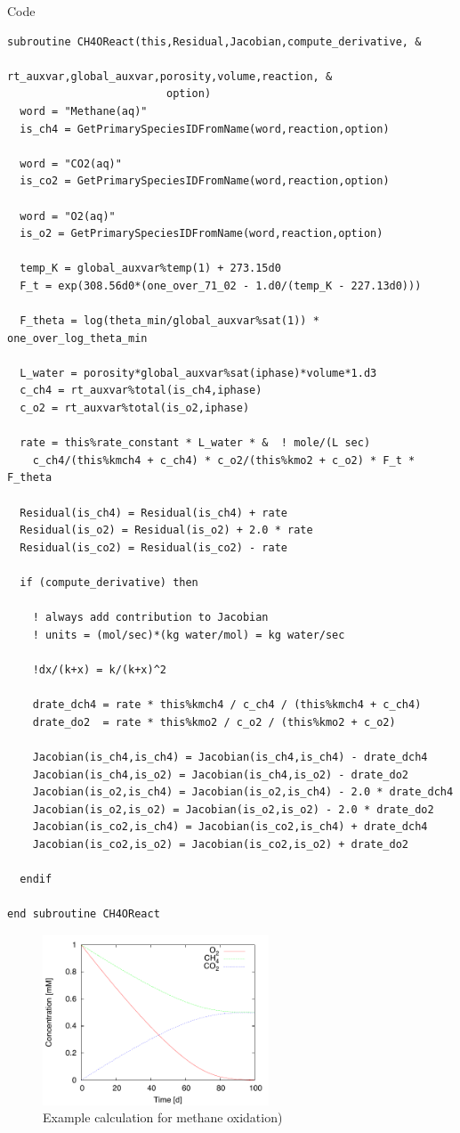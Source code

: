 \documentclass[12pt, a4paper]{article}
\begin{document}
Code
\begin{verbatim}
subroutine CH4OReact(this,Residual,Jacobian,compute_derivative, &
                         rt_auxvar,global_auxvar,porosity,volume,reaction, &
                         option)
  word = "Methane(aq)"
  is_ch4 = GetPrimarySpeciesIDFromName(word,reaction,option)
 
  word = "CO2(aq)"
  is_co2 = GetPrimarySpeciesIDFromName(word,reaction,option)

  word = "O2(aq)"
  is_o2 = GetPrimarySpeciesIDFromName(word,reaction,option)
 
  temp_K = global_auxvar%temp(1) + 273.15d0
  F_t = exp(308.56d0*(one_over_71_02 - 1.d0/(temp_K - 227.13d0)))
 
  F_theta = log(theta_min/global_auxvar%sat(1)) * one_over_log_theta_min
 
  L_water = porosity*global_auxvar%sat(iphase)*volume*1.d3
  c_ch4 = rt_auxvar%total(is_ch4,iphase) 
  c_o2 = rt_auxvar%total(is_o2,iphase)   

  rate = this%rate_constant * L_water * &  ! mole/(L sec)
    c_ch4/(this%kmch4 + c_ch4) * c_o2/(this%kmo2 + c_o2) * F_t * F_theta

  Residual(is_ch4) = Residual(is_ch4) + rate
  Residual(is_o2) = Residual(is_o2) + 2.0 * rate
  Residual(is_co2) = Residual(is_co2) - rate
 
  if (compute_derivative) then

    ! always add contribution to Jacobian
    ! units = (mol/sec)*(kg water/mol) = kg water/sec
  
    !dx/(k+x) = k/(k+x)^2
 
    drate_dch4 = rate * this%kmch4 / c_ch4 / (this%kmch4 + c_ch4)
    drate_do2  = rate * this%kmo2 / c_o2 / (this%kmo2 + c_o2)
 
    Jacobian(is_ch4,is_ch4) = Jacobian(is_ch4,is_ch4) - drate_dch4
    Jacobian(is_ch4,is_o2) = Jacobian(is_ch4,is_o2) - drate_do2
    Jacobian(is_o2,is_ch4) = Jacobian(is_o2,is_ch4) - 2.0 * drate_dch4
    Jacobian(is_o2,is_o2) = Jacobian(is_o2,is_o2) - 2.0 * drate_do2
    Jacobian(is_co2,is_ch4) = Jacobian(is_co2,is_ch4) + drate_dch4
    Jacobian(is_co2,is_o2) = Jacobian(is_co2,is_o2) + drate_do2

  endif
 
end subroutine CH4OReact
\end{verbatim}

\begin{figure}[h]
\centering
\includegraphics[width=0.6\textwidth]{../ch4oxidation/fig.pdf}
\caption{Example calculation for methane oxidation)}
\label{Fig3}
\end{figure}
\end{document}
